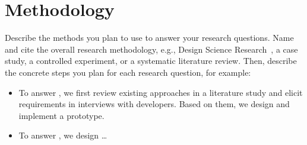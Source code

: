 \section{Methodology}\label{sec:expose:methodology}

Describe the methods you plan to use to answer your research questions.
Name and cite the overall research methodology, e.g., Design Science Research~\cite{Hevner2007}, a case study, a controlled experiment, or a systematic literature review.
Then, describe the concrete steps you plan for each research question, for example:
\begin{itemize}
  \item To answer , we first review existing approaches in a literature study and elicit requirements in interviews with developers.
        Based on them, we design and implement a prototype.
  \item To answer , we design \ldots
\end{itemize}
